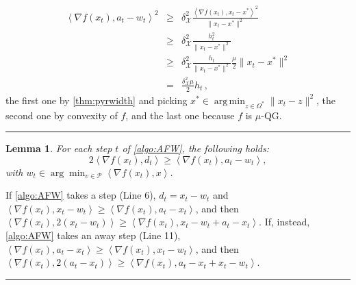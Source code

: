 \documentclass[twoside]{article}
\newcommand{\R}{\mathbb{R}}
\newcommand\linkofproof[1]{\textbf{of \cref{#1}. }\newtarget{proof:#1}}
\newcommand{\jmlrBlackBox}{\rule{1.5ex}{1.5ex}}
\newcommand{\jmlrQED}{\hfill\jmlrBlackBox\par\bigskip}
\providecommand{\proofname}{Proof}
\renewenvironment{proof}{\par\noindent{\bfseries\upshape \proofname\ }}{\jmlrQED}
\newcommand{\mP}{\mathcal{P}}
\newcommand{\mX}{\mathcal{X}}
\newcommand{\innp}[1]{\left\langle #1 \right\rangle}
\DeclareMathOperator*{\argmin}{\mathrm{arg\,min}}
\newcommand{\defi}{\stackrel{\mathrm{\scriptscriptstyle def}}{=}}
\newtheorem{lemma}[theorem]{Lemma}
\begin{document}
%
\begin{proof}%
\begin{equation}
\begin{array}{rcl}
%
\innp{\nabla f(x_t), a_t - w_t}^2 &\ge & \delta_\mX^2\frac{\innp{\nabla f(x_t), x_t - x^\ast}^2}{\|x_t - x^\ast\|^2}\\
%
&\ge & \delta_\mX^2\frac{ h_t^2}{\|x_t - x^\ast\|^2}\\
%
&\ge& \delta_\mX^2\frac{ h_t}{\|x_t - x^\ast\|^2} \frac{\mu}{2}\|x_t - x^\ast\|^2\\
%
& = & \frac{\delta_\mX^2 \mu}{2}h_t\,,
\end{array}
\end{equation}
the first one by \cref{thm:pyrwidth} and picking $x^\ast \in \argmin_{z \in \Omega^\ast} \|x_t - z\|^2$, the second one by convexity of $f$, and the last one because $f$ is $\mu$-QG.
\end{proof}

\begin{lemma}\label{lemma:d_bound}
For each step $t$ of \cref{algo:AFW}, the following holds: 
\[
2 \innp{\nabla f(x_t), d_t} \ge \innp{\nabla f(x_t), a_t - w_t},
\]
with $w_t \in \arg\min_{v \in \mP} \innp{\nabla f(x_t), x}$.
\end{lemma}
\begin{proof}
If \cref{algo:AFW} takes a \FW{} step (Line 6), $d_t = x_t - w_t$ and $\innp{\nabla f(x_t), x_t - w_t} \ge \innp{\nabla f(x_t), a_t - x_t}$, and then $\innp{\nabla f(x_t), 2(x_t - w_t)} \ge \innp{\nabla f(x_t), x_t - w_t + a_t - x_t}$.
If, instead, \cref{algo:AFW} takes an away step (Line 11), $\innp{\nabla f(x_t), a_t - x_t} \ge \innp{\nabla f(x_t), x_t - w_t}$, and then $\innp{\nabla f(x_t), 2(a_t - x_t)} \ge \innp{\nabla f(x_t), a_t - x_t + x_t - w_t}$.
\end{proof}
\end{document}

